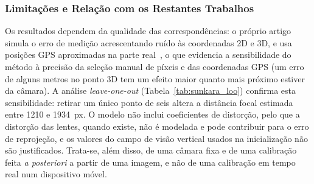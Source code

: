 \subsubsection{Limitações e Relação com os Restantes Trabalhos}

Os resultados dependem da qualidade das correspondências: o próprio artigo simula o erro de medição acrescentando ruído às coordenadas 2D e 3D, e usa posições GPS aproximadas na parte real~\cite{sunkara2025}, o que evidencia a sensibilidade do método à precisão da seleção manual de píxeis e das coordenadas GPS (um erro de alguns metros no ponto 3D tem um efeito maior quanto mais próximo estiver da câmara). A análise \textit{leave-one-out} (Tabela~\ref{tab:sunkara_loo}) confirma esta sensibilidade: retirar um único ponto de seis altera a distância focal estimada entre 1210 e 1934~px. O modelo não inclui coeficientes de distorção, pelo que a distorção das lentes, quando existe, não é modelada e pode contribuir para o erro de reprojeção, e os valores do campo de visão vertical usados na inicialização não são justificados. Trata-se, além disso, de uma câmara fixa e de uma calibração feita \textit{a posteriori} a partir de uma imagem, e não de uma calibração em tempo real num dispositivo móvel.
